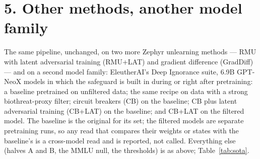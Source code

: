 \documentclass[11pt]{article}
\begin{document}
\section*{5. Other methods, another model family}

The same pipeline, unchanged, on two more Zephyr unlearning methods --- RMU with latent adversarial
training (RMU+LAT) and gradient difference (GradDiff) --- and on a second model family: EleutherAI's
Deep Ignorance suite, 6.9B GPT-NeoX models in which the safeguard is built in during or right after
pretraining: a baseline pretrained on unfiltered data; the same recipe on data with a strong
biothreat-proxy filter; circuit breakers (CB) on the baseline; CB plus latent adversarial training
(CB+LAT) on the baseline; and CB+LAT on the filtered model. The baseline is the original for its
set; the filtered models are separate pretraining runs, so any read that compares their weights or
states with the baseline's is a cross-model read and is reported, not called. Everything else
(halves A and B, the MMLU null, the thresholds) is as above; Table~\ref{tab:sota}.
\end{document}
